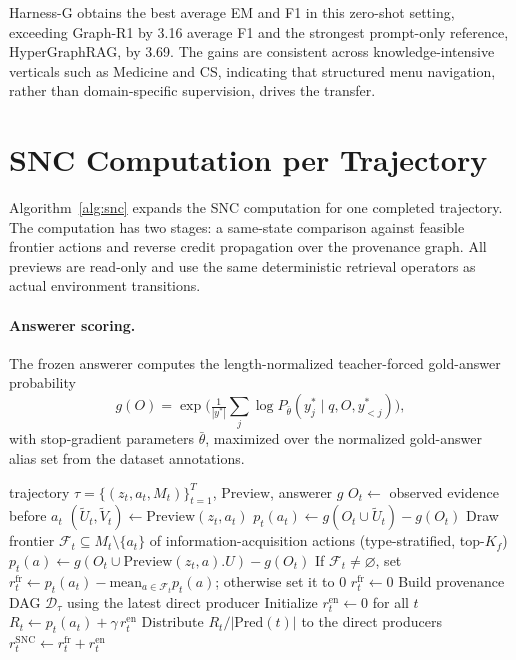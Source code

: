 \documentclass[letterpaper]{article} %
\begin{document}
Harness-G obtains the best average EM and F1 in this zero-shot setting, exceeding Graph-R1 by 3.16 average F1 and the strongest prompt-only reference, HyperGraphRAG, by 3.69.
The gains are consistent across knowledge-intensive verticals such as Medicine and CS, indicating that structured menu navigation, rather than domain-specific supervision, drives the transfer.

\section{SNC Computation per Trajectory}
\label{app:snc-alg}

Algorithm~\ref{alg:snc} expands the SNC computation for one completed trajectory.
The computation has two stages: a same-state comparison against feasible frontier actions and reverse credit propagation over the provenance graph.
All previews are read-only and use the same deterministic retrieval operators as actual environment transitions.

\paragraph{Answerer scoring.}
The frozen answerer computes the length-normalized teacher-forced gold-answer probability
\begin{equation}
g(O)=\exp\Big(\tfrac{1}{|y^*|}\textstyle\sum_{j}\log P_{\bar\theta}(y^*_j\mid q,O,y^*_{<j})\Big),
\end{equation}
with stop-gradient parameters $\bar\theta$, maximized over the normalized gold-answer alias set from the dataset annotations.

\begin{algorithm}[t]
\caption{SNC credit computation for one trajectory.}
\label{alg:snc}
\begin{algorithmic}[1]
\REQUIRE trajectory $\tau=\{(z_t,a_t,M_t)\}_{t=1}^{T}$, $\mathrm{Preview}$, answerer $g$
  \STATE $O_t \leftarrow$ observed evidence before $a_t$
  \STATE $(\widetilde{U}_t, \widetilde{V}_t) \leftarrow \mathrm{Preview}(z_t,a_t)$
  \STATE $p_t(a_t)\leftarrow g(O_t\cup\widetilde{U}_t)-g(O_t)$
    \STATE Draw frontier $\mathcal{F}_t\subseteq M_t\setminus\{a_t\}$ of information-acquisition actions (type-stratified, top-$K_f$)
      \STATE $p_t(a)\leftarrow g(O_t\cup\mathrm{Preview}(z_t,a).U)-g(O_t)$
    \ENDFOR
    \STATE If $\mathcal{F}_t\ne\varnothing$, set $r^{\mathrm{fr}}_t\leftarrow p_t(a_t)-\mathrm{mean}_{a\in\mathcal{F}_t}p_t(a)$; otherwise set it to $0$
  \ELSE
    \STATE $r^{\mathrm{fr}}_t\leftarrow 0$
  \ENDIF
\ENDFOR
\STATE Build provenance DAG $\mathcal{D}_\tau$ using the latest direct producer
\STATE Initialize $r^{\mathrm{en}}_t\leftarrow 0$ for all $t$
  \STATE $R_t\leftarrow p_t(a_t)+\gamma\, r^{\mathrm{en}}_t$
  \STATE Distribute $R_t/|\mathrm{Pred}(t)|$ to the direct producers
\ENDFOR
{}
  \STATE $r^{\mathrm{SNC}}_t\leftarrow r^{\mathrm{fr}}_t+r^{\mathrm{en}}_t$
\ENDFOR
\end{algorithmic}
\end{algorithm}
\end{document}
